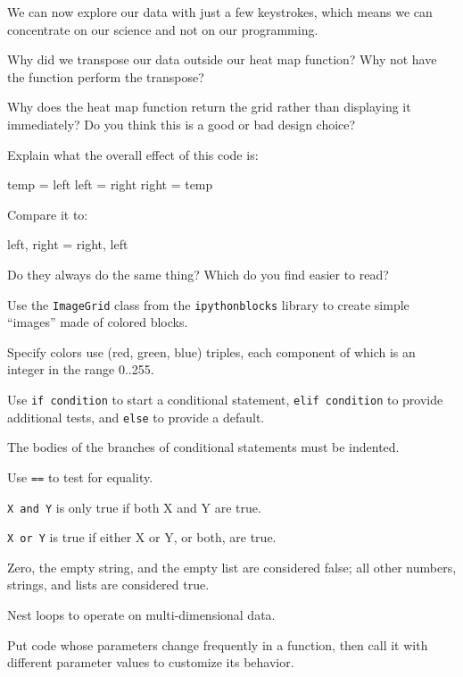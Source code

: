 We can now explore our data with just a few keystrokes, which means we
can concentrate on our science and not on our programming.

\begin{challenge}
  Why did we transpose our data outside our heat map function? Why not
  have the function perform the transpose?
\end{challenge}

\begin{challenge}
  Why does the heat map function return the grid rather than displaying
  it immediately? Do you think this is a good or bad design choice?
\end{challenge}

\begin{challenge}
  Explain what the overall effect of this code is:
\begin{VerbIn}
temp = left
left = right
right = temp
\end{VerbIn}
Compare it to:
\begin{VerbIn}
left, right = right, left
\end{VerbIn}
  Do they always do the same thing?
  Which do you find easier to read?
\end{challenge}

\begin{keypoints}
\begin{swcitemize}
\item
  Use the \texttt{ImageGrid} class from the \texttt{ipythonblocks}
  library to create simple ``images'' made of colored blocks.
\item
  Specify colors use (red, green, blue) triples, each component of which
  is an integer in the range 0..255.
\item
  Use \texttt{if condition} to start a conditional statement,
  \texttt{elif condition} to provide additional tests, and \texttt{else}
  to provide a default.
\item
  The bodies of the branches of conditional statements must be indented.
\item
  Use \texttt{==} to test for equality.
\item
  \texttt{X and Y} is only true if both X and Y are true.
\item
  \texttt{X or Y} is true if either X or Y, or both, are true.
\item
  Zero, the empty string, and the empty list are considered false; all
  other numbers, strings, and lists are considered true.
\item
  Nest loops to operate on multi-dimensional data.
\item
  Put code whose parameters change frequently in a function, then call
  it with different parameter values to customize its behavior.
\end{swcitemize}
\end{keypoints}

